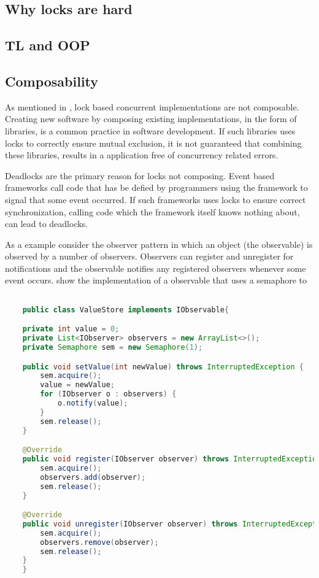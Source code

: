 \subsection{Why locks are hard}
\subsection{\ac{TL} and OOP}

\subsection{Composability}
As mentioned in , lock based concurrent implementations are not composable. Creating new software by composing existing implementations, in the form of libraries, is a common practice in software development. If such libraries uses locks to correctly ensure mutual exclusion, it is not guaranteed that combining these libraries, results in a application free of concurrency related errors.

Deadlocks are the primary reason for locks not composing\cite[p. 58]{sutter2005software}. Event based frameworks call code that has be defied by programmers using the framework to signal that some event occurred. If such frameworks uses locks to ensure correct synchronization, calling code which the framework itself knows nothing about, can lead to deadlocks.

As a example consider the observer pattern\cite{gamma1994design} in which an object (the observable) is observed by a number of observers. Observers can register and unregister for notifications and the observable notifies any registered observers whenever some event occurs.  show the implementation of a observable that uses a semaphore to  

\begin{lstlisting}[float,label=lst:observer,
  caption={Observer pattern with locks},
  language=Java,  
  showspaces=false,
  showtabs=false,
  breaklines=true,
  showstringspaces=false,
  breakatwhitespace=true,
  commentstyle=\color{greencomments},
  keywordstyle=\color{bluekeywords},
  stringstyle=\color{redstrings}]  % Start your code-block

	public class ValueStore implements IObservable{

    private int value = 0;
    private List<IObserver> observers = new ArrayList<>();
    private Semaphore sem = new Semaphore(1);

    public void setValue(int newValue) throws InterruptedException {
        sem.acquire();
        value = newValue;
        for (IObserver o : observers) {
            o.notify(value);
        }
        sem.release();
    }

    @Override
    public void register(IObserver observer) throws InterruptedException {
        sem.acquire();
        observers.add(observer);
        sem.release();
    }

    @Override
    public void unregister(IObserver observer) throws InterruptedException {
        sem.acquire();
        observers.remove(observer);
        sem.release();
    }
	}

\end{lstlisting}

